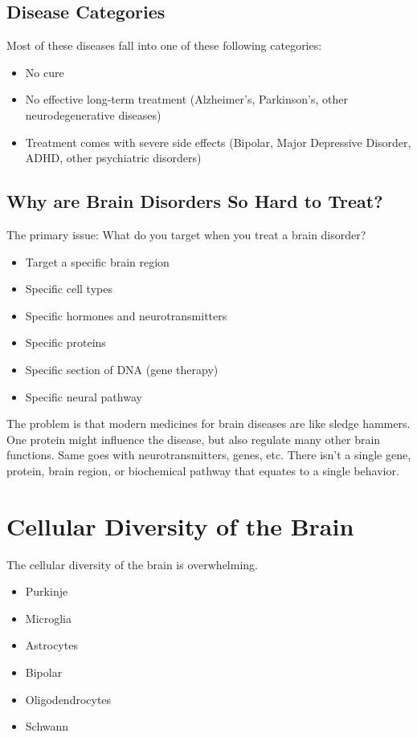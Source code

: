 \documentclass[10pt]{article}
\begin{document}
\subsection*{Disease Categories}
Most of these diseases fall into one of these following categories:
\begin{itemize}
	\item No cure
	\item No effective long-term treatment (Alzheimer's, Parkinson's, other neurodegenerative diseases)
	\item Treatment comes with severe side effects (Bipolar, Major Depressive Disorder, ADHD, other psychiatric disorders)
\end{itemize}

\subsection*{Why are Brain Disorders So Hard to Treat?}
The primary issue: What do you target when you treat a brain disorder?
\begin{itemize}
	\item Target a specific brain region
	\item Specific cell types
	\item Specific hormones and neurotransmitters
	\item Specific proteins
	\item Specific section of DNA (gene therapy)
	\item Specific neural pathway
\end{itemize}
The problem is that modern medicines for brain diseases are like sledge hammers.  One protein might influence the disease, but also regulate many other brain functions.  Same goes with neurotransmitters, genes, etc.  There isn't a single gene, protein, brain region, or biochemical pathway that equates to a single behavior.

\section*{Cellular Diversity of the Brain}
The cellular diversity of the brain is overwhelming.
\begin{itemize}
	\item Purkinje
	\item Microglia
	\item Astrocytes
	\item Bipolar
	\item Oligodendrocytes
	\item Schwann
\end{itemize}
\end{document}

